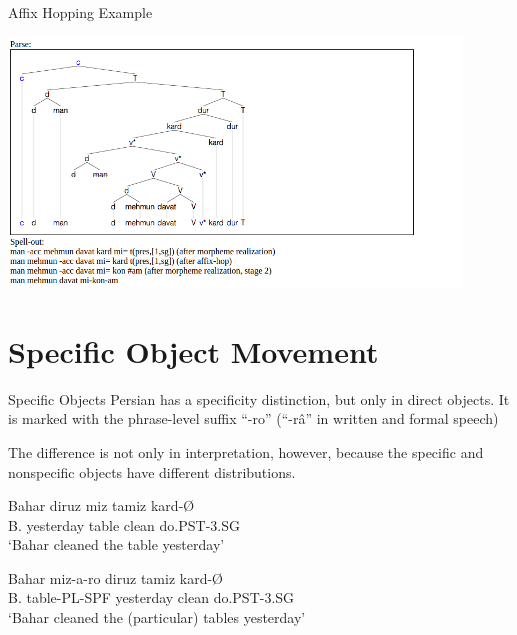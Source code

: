 \documentclass[10pt]{beamer}
\begin{document}
\begin{frame}[fragile]{Affix Hopping Example}
  
  \includegraphics[width=12cm]{affixhopping.png}
  
\end{frame}

\section*{Specific Object Movement}


\begin{frame}[fragile]{Specific Objects}
  Persian has a specificity distinction, but only in direct objects. It is marked with the phrase-level suffix ``-ro'' (``-râ'' in written and formal speech)

  The difference is not only in interpretation, however, because the specific and nonspecific objects have different distributions. 

  \begin{exe}
    \ex
    \gll Bahar diruz miz tamiz kard-Ø\\
    B. yesterday table clean do.PST-3.SG\\
    \trans `Bahar cleaned the table yesterday'
  \end{exe}
  \begin{exe}
    \ex
    \gll Bahar miz-a-ro diruz tamiz kard-Ø\\
    B. table-PL-SPF yesterday clean do.PST-3.SG\\
    \trans `Bahar cleaned the (particular) tables yesterday'
  \end{exe}


\end{frame}
\end{document}
